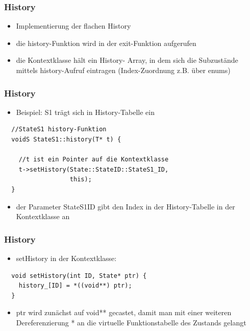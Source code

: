 \documentclass{beamer}
\begin{document}
\begin{frame}
 \frametitle{History}
 \begin{itemize}
  \item Implementierung der flachen History
  \item die history-Funktion  wird in der exit-Funktion aufgerufen
  \item die Kontextklasse h\"alt ein History- Array,
  in dem sich die Subzust\"ande mittels history-Aufruf eintragen (Index-Zuordnung z.B. \"uber enums)
 \end{itemize}
\end{frame}

\begin{frame}[fragile]
 \frametitle{History}
 \begin{itemize}
  \item Beispiel: S1 tr\"agt sich in History-Tabelle ein
 \end{itemize}
 \begin{lstlisting}
  //StateS1 history-Funktion
  voidS StateS1::history(T* t) {

    //t ist ein Pointer auf die Kontextklasse
    t->setHistory(State::StateID::StateS1_ID,
                  this);
  }
 \end{lstlisting}
 \begin{itemize}
  \item der Parameter StateS1ID gibt den Index in der History-Tabelle in der Kontextklasse an
 \end{itemize}
\end{frame}

\begin{frame}[fragile]
 \frametitle{History}
 \begin{itemize}
  \item setHistory in der Kontextklasse:
 \end{itemize}
 \begin{lstlisting}
  void setHistory(int ID, State* ptr) {
    history_[ID] = *((void**) ptr);
  }
 \end{lstlisting}
 \begin{itemize}
  \item ptr wird zun\"achst auf void** gecastet, damit man mit einer weiteren Dereferenzierung * an die virtuelle Funktionstabelle des Zustands gelangt
 \end{itemize}
\end{frame}
\end{document}
